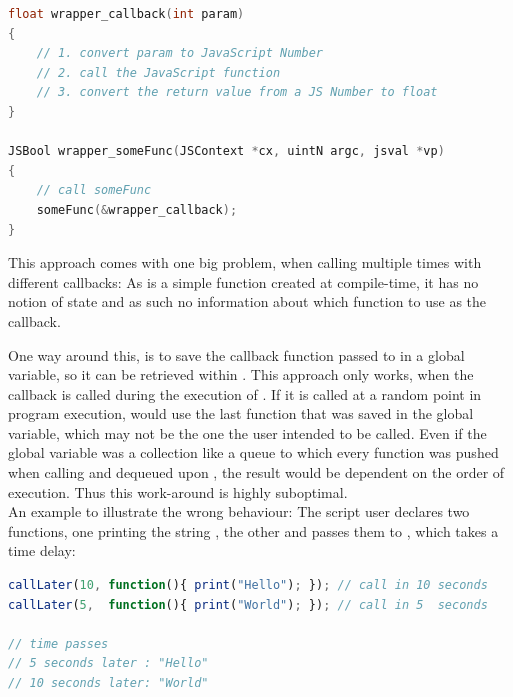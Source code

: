 \SingleSpacing
\begin{lstlisting}[language=C++, caption=Wrapper code for handling methods that take function pointers \#1]
float wrapper_callback(int param)
{
	// 1. convert param to JavaScript Number
	// 2. call the JavaScript function
	// 3. convert the return value from a JS Number to float
}

JSBool wrapper_someFunc(JSContext *cx, uintN argc, jsval *vp)
{
	// call someFunc
	someFunc(&wrapper_callback);
}
\end{lstlisting}
\OnehalfSpacing

This approach comes with one big problem, when calling  multiple times with different  callbacks: As  is a simple  function created at compile-time, it has no notion of state and as such no information about which  function to use as the callback.

One way around this, is to save the  callback function passed to \linebreak{} in a global variable, so it can be retrieved within . This approach only works, when the callback is called during the execution of . If it is called at a random point in program execution,  would use the last  function that was saved in the global variable, which may not be the one the user intended to be called. Even if the global variable was a collection like a queue to which every  function was pushed when calling  and dequeued upon , the result would be dependent on the order of execution. Thus this work-around is highly suboptimal.\\
An example to illustrate the wrong behaviour: The script user declares two  functions, one printing the string , the other  and passes them to \linebreak{}, which takes a time delay:

\newpage
\SingleSpacing
\begin{lstlisting}[language=JavaScript, caption=Passing a callback function]
callLater(10, function(){ print("Hello"); }); // call in 10 seconds
callLater(5,  function(){ print("World"); }); // call in 5  seconds

// time passes
// 5 seconds later : "Hello"
// 10 seconds later: "World"
\end{lstlisting}
\OnehalfSpacing

